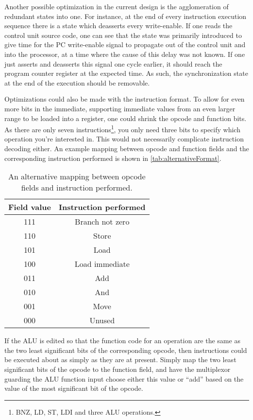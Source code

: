 \documentclass[11pt]{article}
\begin{document}
Another possible optimization in the current design is the
agglomeration of redundant states into one. For instance, at the end
of every instruction execution sequence there is a state which
deasserts every write-enable. If one reads the control unit source
code, one can see that the state was primarily introduced to give time
for the PC write-enable signal to propagate out of the control unit
and into the processor, at a time where the cause of this delay was
not known. If one just asserts and deasserts this signal one cycle
earlier, it should reach the program counter register at the expected
time. As such, the synchronization state at the end of the execution
should be removable.\newline

Optimizations could also be made with the instruction format. To allow
for even more bits in the immediate, supporting immediate values
from an even larger range to be loaded into a register, one could
shrink the opcode and function bits. As there are only seven
instructions\footnote{BNZ, LD, ST, LDI and three ALU operations.}, you
only need three bits to specify which operation you're interested
in. This would not necessarily complicate instruction decoding
either. An example mapping between opcode and function fields and the
corresponding instruction performed is shown in
\autoref{tab:alternativeFormat}. 
\begin{table}[htbp]
  \centering
  \begin{tabular}{|c|c|}
    \hline
    {\bf Field value} & {\bf Instruction performed} \\ \hline
    111 & Branch not zero \\ \hline
    110 & Store \\ \hline
    101 & Load \\ \hline
    100 & Load immediate \\ \hline
    011 & Add \\ \hline
    010 & And \\ \hline
    001 & Move \\ \hline
    000 & Unused \\ \hline
  \end{tabular}
  \caption{An alternative mapping between opcode fields and instruction performed.}
  \label{tab:alternativeFormat}
\end{table}
If the ALU is edited so that the
function code for an operation are the same as the two least
significant bits of the corresponding opcode, then instructions could
be executed about as simply as they are at present. Simply map the two
least significant bits of the opcode to the function field, and have
the multiplexor guarding the ALU function input choose either this
value or ``add'' based on the value of the most significant bit of the
opcode. 
\end{document}
